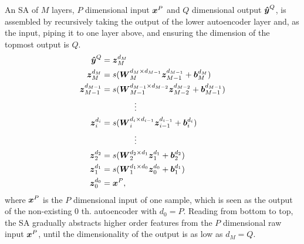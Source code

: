 {An SA of $M$ layers, $P$ dimensional input $\boldsymbol{x}^P$ and $Q$ dimensional output $\boldsymbol{\hat{y}}^Q$, is assembled by recursively taking the output of the lower autoencoder layer and, as the input, piping it to one layer above, and ensuring the dimension of the topmost output is $Q$.
\begin{equation} \label{eq:ES}
  \begin{split}
    \boldsymbol{\hat{y}}^Q &= {\boldsymbol{z}_{M}^{d_{M}}} \\
    {\boldsymbol{z}_{M  }^{d_{M  }}} &= s(\boldsymbol{W}_{M  }^{d_{M  } \times d_{M-1}} {\boldsymbol{z}_{M-1}^{d_{M-1}}} + \boldsymbol{b}_{M  }^{d_{M  }}) \\
    {\boldsymbol{z}_{M-1}^{d_{M-1}}} &= s(\boldsymbol{W}_{M-1}^{d_{M-1} \times d_{M-2}} {\boldsymbol{z}_{M-2}^{d_{M-2}}} + \boldsymbol{b}_{M-1}^{d_{M-1}}) \\
    & \quad \quad \quad \quad \vdots \\
    {\boldsymbol{z}_{i  }^{d_{i  }}} &= s(\boldsymbol{W}_{i  }^{d_{i  } \times d_{i-1}} {\boldsymbol{z}_{i-1}^{d_{i-1}}} + \boldsymbol{b}_{i  }^{d_{i  }}) \\
    & \quad \quad \quad \quad \vdots \\
    {\boldsymbol{z}_{2  }^{d_{2  }}} &= s(\boldsymbol{W}_{2  }^{d_{2  } \times d_{1  }} {\boldsymbol{z}_{1  }^{d_{1  }}} + \boldsymbol{b}_{2  }^{d_{2  }}) \\
    {\boldsymbol{z}_{1  }^{d_{1  }}} &= s(\boldsymbol{W}_{1  }^{d_{1  } \times d_{0  }} {\boldsymbol{z}_{0  }^{d_{0  }}} + \boldsymbol{b}_{1  }^{d_{1  }}) \\
    {\boldsymbol{z}_{0  }^{d_{0  }}} &= \boldsymbol{x}^P,
  \end{split}
\end{equation}
where $\boldsymbol{x}^P$ is the $P$ dimensional input of one sample, which is seen as the output of the non-existing $0$ th. autoencoder with $d_0=P$. Reading from bottom to top, the SA gradually abstracts higher order features from the $P$ dimensional raw input $\boldsymbol{x}^P$, until the dimensionality of the output is as low as $d_M=Q$.

}
